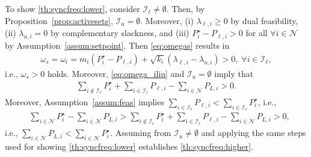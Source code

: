 \documentclass[twocolumn,twoside,journal]{IEEEtran}
\newcommand{\mc}{\mathcal}
\begin{document}
To show \ref{th:syncfreq:lower}, consider $\mathcal{I}_{\ell} \neq \emptyset$. Then, by Proposition~\ref{prop:activesets}, $\mathcal{I}_{u} = \emptyset$. Moreover, (i) $\lambda_{\ell, i} \geq 0$ by dual feasibility, (ii) $\lambda_{u, i} = 0$ by complementary slackness, and (iii) $P^\star_i - P_{\ell, i} >0$ for all $\forall i \in \mc N$ by Assumption~\ref{assum:setpoint}. Then \eqref{eq:omegas} results in
\begin{align*}
    \omega_s = \omega_i = m_i (P^\star_i - P_{\ell, i}) + \sqrt{k_i} (\lambda_{\ell, i} - \lambda_{u,i}) >0, \; \forall i \in \mathcal{I}_{\ell},
\end{align*}
i.e., $\omega_s>0$ holds. Moreover, \eqref{eq:omega_iliu} and $\mc I_u=\emptyset$ imply that
\begin{align*}
    \sum\nolimits_{i \notin \mathcal{I}_{\ell}}  P_i^\star+\sum\nolimits_{i \in \mathcal{I}_\ell}  P_{\ell, i}-\sum\nolimits_{i \in \mathcal{N}} P_{L, i} >0.
\end{align*}
Moreover, Assumption~\ref{assum:feas} implies $\sum_{i \in \mathcal{I}_\ell} \! P_{\ell, i} < \sum_{i \in \mathcal{I}_\ell} \! P^\star_i$, i.e.,
\begin{align*}
    &\sum_{i \in \mc N} \! P_i^\star-\sum_{i \in \mathcal{N}}\! P_{L, i} > \sum_{i \notin \mathcal{I}_{\ell}} \! P_i^\star+\sum_{i \in \mathcal{I}_\ell} \! P_{\ell, i}-\sum_{i \in \mathcal{N}}\! P_{L, i} >0,
\end{align*}
i.e., $\sum_{i \in \mathcal{N}}\! P_{L, i}<\sum_{i \in \mc N} \! P_i^\star$. Assuming from $\mathcal{I}_{u} \neq \emptyset$ and applying the same steps used for showing \ref{th:syncfreq:lower} establishes \ref{th:syncfreq:higher}.
\end{document}
